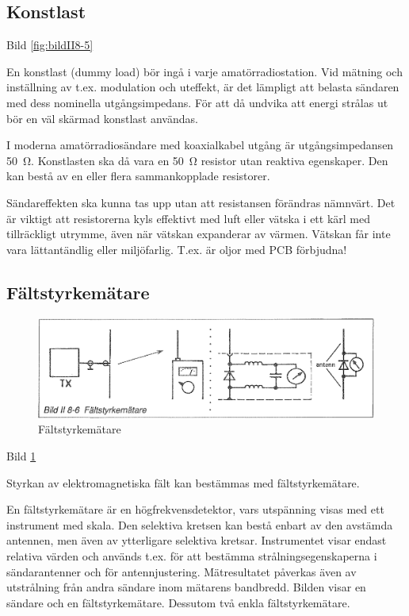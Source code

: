 \subsection{Konstlast}

Bild \ref{fig:bildII8-5}

En konstlast (dummy load) bör ingå i varje amatörradiostation.  Vid
mätning och inställning av t.ex. modulation och uteffekt, är det
lämpligt att belasta sändaren med dess nominella utgångsimpedans.  För
att då undvika att energi strålas ut bör en väl skärmad konstlast
användas.

I moderna amatörradiosändare med koaxialkabel utgång är
utgångsimpedansen 50~Ω. Konstlasten ska då vara en 50~Ω resistor
utan reaktiva egenskaper.  Den kan bestå av en eller flera
sammankopplade resistorer.

Sändareffekten ska kunna tas upp utan att resistansen förändras
nämnvärt. Det är viktigt att resistorerna kyls effektivt med luft
eller vätska i ett kärl med tillräckligt utrymme, även när vätskan
expanderar av värmen.  Vätskan får inte vara lättantändlig eller
miljöfarlig.  T.ex. är oljor med PCB förbjudna!

\subsection{Fältstyrkemätare}

\begin{figure}
  \includegraphics[width=\textwidth]{images/bild_2_8-06}
  \caption{Fältstyrkemätare}
  \label{fig:bildII8-6}
\end{figure}

Bild \ref{fig:bildII8-6}

Styrkan av elektromagnetiska fält kan bestämmas med fältstyrkemätare.

En fältstyrkemätare är en högfrekvensdetektor, vars utspänning visas
med ett instrument med skala.  Den selektiva kretsen kan bestå enbart
av den avstämda antennen, men även av ytterligare selektiva
kretsar. Instrumentet visar endast relativa värden och används
t.ex. för att bestämma strålningsegenskaperna i sändarantenner och för
antennjustering.  Mätresultatet påverkas även av utstrålning från
andra sändare inom mätarens bandbredd.  Bilden visar en sändare och en
fältstyrkemätare.  Dessutom två enkla fältstyrkemätare.

